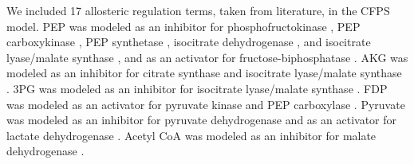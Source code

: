 \documentclass[12pt]{article}
\begin{document}
We included 17 allosteric regulation terms, taken from literature, in the CFPS model.
PEP was modeled as an inhibitor for phosphofructokinase \cite{2010_kotte_MolSystBiol,2011_cabrera_JBiolChem}, PEP carboxykinase \cite{2010_kotte_MolSystBiol}, PEP synthetase \cite{2010_kotte_MolSystBiol,1973_chulavatnatol_JBiolChem}, isocitrate dehydrogenase \cite{2010_kotte_MolSystBiol,2007_ogawa_JBacteriol}, and isocitrate lyase/malate synthase \cite{2010_kotte_MolSystBiol,2007_ogawa_JBacteriol,1988_mackintosh_BiochemJ}, and as an activator for fructose-biphosphatase \cite{2010_kotte_MolSystBiol,2000_donahue_JBacteriol,2006_hines_JBiolChem,2007_hines_JBiolChem}.
AKG was modeled as an inhibitor for citrate synthase \cite{2010_kotte_MolSystBiol,1994_pereira_JBiolChem,1983_robinson_FEBSLett} and isocitrate lyase/malate synthase \cite{2010_kotte_MolSystBiol,1988_mackintosh_BiochemJ}.
3PG was modeled as an inhibitor for isocitrate lyase/malate synthase \cite{2010_kotte_MolSystBiol,1988_mackintosh_BiochemJ}.
FDP was modeled as an activator for pyruvate kinase \cite{2010_kotte_MolSystBiol,2010_zhu_Biochimie} and PEP carboxylase \cite{2010_kotte_MolSystBiol,1972_wohl_JBiolChem}.
Pyruvate was modeled as an inhibitor for pyruvate dehydrogenase \cite{2010_kotte_MolSystBiol,2007_kale_JBiolChem,2002_arjunan_Biochemistry} and as an activator for lactate dehydrogenase \cite{2008_okino_ApplMicrobiolBiotechnol}.
Acetyl CoA was modeled as an inhibitor for malate dehydrogenase \cite{2010_kotte_MolSystBiol}.
\end{document}
